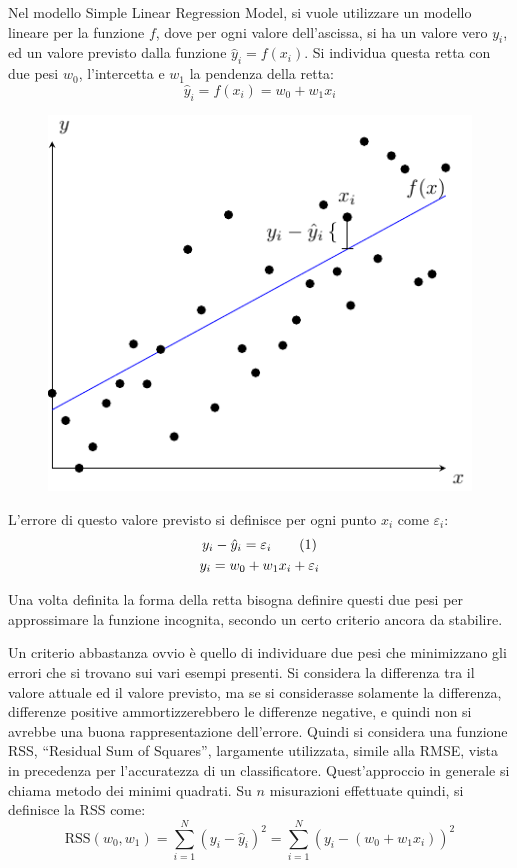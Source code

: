 \documentclass{article}
\numberwithin{equation}{subsection}
\newcommand{\tageq}{\tag{\stepcounter{equation}\theequation}}
\begin{document}
Nel modello Simple Linear Regression Model, si vuole utilizzare un modello lineare per la 
funzione $f$, dove per ogni valore dell'ascissa, si ha un valore vero $y_i$, ed un valore 
previsto dalla funzione $\hat{y}_i=f(x_i)$. 
Si individua questa retta con due pesi $w_0$, l'intercetta e $w_1$ la pendenza della retta:
\begin{equation*}
    \hat{y}_i=f(x_i)=w_0+w_1x_i
\end{equation*}

\begin{figure}[H]%
    \centering%
    \includegraphics[scale=0.75]{regressione_lineare.pdf}%
\end{figure}

L'errore di questo valore previsto si definisce per ogni punto $x_i$ come $\varepsilon_i$:
\begin{gather*}
    y_i-\hat{y}_i=\varepsilon_i\tageq\\
    y_i=w_0+w_1x_i+\varepsilon_i
\end{gather*}


Una volta definita la forma della retta bisogna definire questi due pesi per approssimare la 
funzione incognita, secondo un certo criterio ancora da stabilire. 

Un criterio abbastanza ovvio è quello di individuare due pesi che minimizzano gli errori 
che si trovano sui vari esempi presenti. 
Si considera la differenza tra il valore attuale ed il valore previsto, ma se si considerasse solamente la differenza, differenze positive ammortizzerebbero le differenze 
negative, e quindi non si avrebbe una buona rappresentazione dell'errore. 
Quindi si considera una funzione RSS, ``Residual Sum of Squares'', largamente utilizzata, simile alla RMSE, vista in precedenza per l'accuratezza di un classificatore. Quest'approccio in generale si chiama 
metodo dei minimi quadrati. Su $n$ misurazioni effettuate quindi, 
si definisce la RSS come:
\begin{equation}
    \text{RSS}(w_0,w_1)=\displaystyle\sum_{i=1}^N(y_i-\hat{y}_i)^2=\sum_{i=1}^N(y_i-(w_0+w_1x_i))^2
\end{equation}
\end{document}
